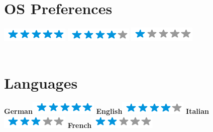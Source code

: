 \documentclass{article}
\begin{document}
\begin{minipage}[t]{0.2\textwidth}
	\flushright
	\section*{\hfill \color{pblue} OS Preferences}
	\vspace{-2mm}
	\textbf{\faLinux}\includegraphics[scale=0.40]{img/5stars.png}
	\textbf{\faWindows}\includegraphics[scale=0.40]{img/4stars.png}
    \textbf{\faApple}\includegraphics[scale=0.40]{img/1stars.png}\\
~
	\section*{\hfill \color{pblue} Languages}
	\vspace{-2mm}
	\textbf{German}\includegraphics[scale=0.40]{img/5stars.png}
	\textbf{English}\includegraphics[scale=0.40]{img/4stars.png}
    \textbf{Italian}\includegraphics[scale=0.67]{img/3stars.png}
    \textbf{French}\includegraphics[scale=0.40]{img/2stars.png}
\end{minipage}
\hfill
\vrule
\hfill
\end{document}
